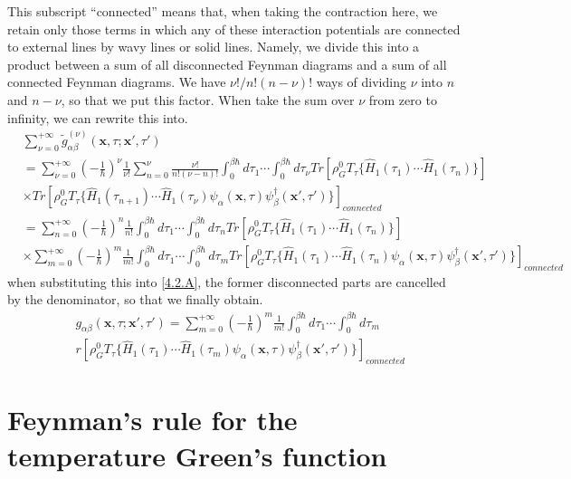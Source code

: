 This subscript ``connected'' means that, when taking the contraction here, we retain only those terms in which any of these interaction potentials are connected to external lines by wavy lines or solid lines.
Namely, we divide this into a product between a sum of all disconnected Feynman diagrams and a sum of all connected Feynman diagrams.
We have $\nu!/n!(n-\nu)!$ ways of dividing $\nu$ into $n$ and $n-\nu$, so that we put this factor.
When take the sum over $\nu$ from zero to infinity, we can rewrite this into.
$$
\begin{aligned}
&\sum_{\nu=0}^{+\infty}\tilde{g}^{(\nu)}_{\alpha\beta}(\mathbf{x},\tau;\mathbf{x}',\tau')\\
&=\sum_{\nu=0}^{+\infty}\left(-\frac{1}{\hbar}\right)^\nu \frac{1}{\nu!} \sum_{n=0}^\nu \frac{\nu!}{n!(\nu-n)!} \int_0^{\beta\hbar}d\tau_1\cdots \int_0^{\beta\hbar}d\tau_\nu Tr\left[\rho_G^0 T_\tau\{\hat{H}_1(\tau_1) \cdots \hat{H}_1(\tau_n)\}\right]\\
&\times Tr\left[\rho_G^0 T_\tau\{\hat{H}_1(\tau_{n+1}) \cdots \hat{H}_1(\tau_\nu) \psi_\alpha(\mathbf{x},\tau) \psi_\beta^\dagger(\mathbf{x}',\tau')\}\right]_{connected}\\
&=\sum_{n=0}^{+\infty}\left(-\frac{1}{\hbar}\right)^n \frac{1}{n!} \int_0^{\beta\hbar}d\tau_1\cdots \int_0^{\beta\hbar}d\tau_n Tr\left[\rho_G^0 T_\tau\{\hat{H}_1(\tau_1) \cdots \hat{H}_1(\tau_n)\}\right]\\
&\times\sum_{m=0}^{+\infty}\left(-\frac{1}{\hbar}\right)^m \frac{1}{m!} \int_0^{\beta\hbar}d\tau_1\cdots \int_0^{\beta\hbar}d\tau_m Tr\left[\rho_G^0 T_\tau\{\hat{H}_1(\tau_1) \cdots \hat{H}_1(\tau_n) \psi_\alpha(\mathbf{x},\tau) \psi_\beta^\dagger(\mathbf{x}',\tau')\}\right]_{connected}
\end{aligned}
$$
when substituting this into \ref{4.2.A}, the former disconnected parts are cancelled by the denominator, so that we finally obtain.
\begin{equation}\label{4.3.E}
\begin{aligned}
&g_{\alpha\beta}(\mathbf{x},\tau;\mathbf{x}',\tau')=\sum_{m=0}^{+\infty} \left(-\frac{1}{\hbar}\right)^m \frac{1}{m!} \int_0^{\beta\hbar} d\tau_1 \cdots \int_0^{\beta\hbar} d\tau_m\\
&r\left[\rho_G^0 T_\tau\{\hat{H}_1(\tau_1)\cdots\hat{H}_1(\tau_m)\psi_\alpha(\mathbf{x},\tau)\psi_\beta^\dagger(\mathbf{x}',\tau')\}\right]_{connected}
\end{aligned}
\end{equation}

\section{Feynman's rule for the temperature Green's function}

